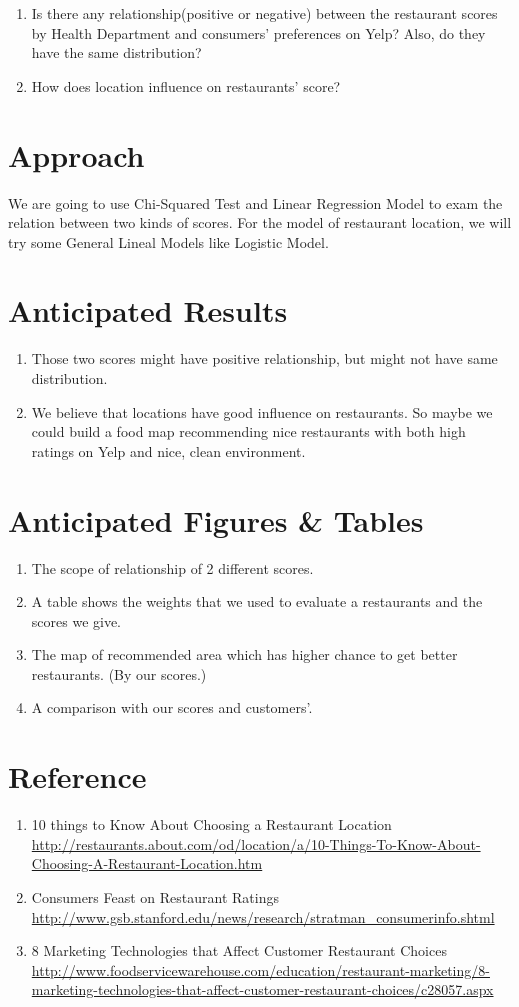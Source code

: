\documentclass{article}
\begin{document}
\begin{enumerate}
  \item Is there any relationship(positive or negative) between the restaurant scores by Health Department and consumers' preferences on Yelp? Also, do they have  the same distribution?
  \item How does location influence on restaurants' score?
\end{enumerate}

\section{Approach}
We are going to use Chi-Squared Test and Linear Regression Model to exam the relation between two kinds of scores. For the model of restaurant location, we will try some General Lineal Models like Logistic Model.

\section{Anticipated Results}
\begin{enumerate}
  \item Those two scores might have positive relationship, but might not have same distribution.
  \item We believe that locations have good influence on restaurants. So maybe we could build a food map recommending nice restaurants with both high ratings on Yelp and nice, clean environment. 
\end{enumerate}


\section{Anticipated Figures \& Tables}
\begin{enumerate}
  \item The scope of relationship of 2 different scores.
  \item A table shows the weights that we used to evaluate a restaurants and the scores we give.
   \item The map of recommended area which has higher chance to get better restaurants. (By our scores.)
  \item A comparison with our scores and customers'. 
\end{enumerate}



\section{Reference}
\begin{enumerate}
  \item10 things to Know About Choosing a Restaurant Location \url{http://restaurants.about.com/od/location/a/10-Things-To-Know-About-Choosing-A-Restaurant-Location.htm}
  \item Consumers Feast on Restaurant Ratings \url{http://www.gsb.stanford.edu/news/research/stratman_consumerinfo.shtml}
  \item 8 Marketing Technologies that Affect Customer Restaurant Choices \url{http://www.foodservicewarehouse.com/education/restaurant-marketing/8-marketing-technologies-that-affect-customer-restaurant-choices/c28057.aspx}
\end{enumerate}
\end{document}
